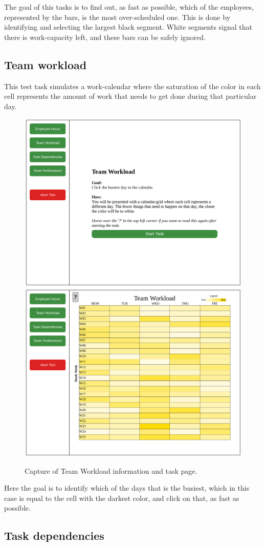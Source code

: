 {		The goal of this tasks is to find out, as fast as possible, which of the
		employees, represented by the bars, is the most over-scheduled one. This is
		done by identifying and selecting the largest black segment. White segments
		signal that there is work-capacity left, and these bars can be safely
		ignored.

  \subsection{Team workload}

		This test task simulates a work-calendar where the saturation of the color
		in each cell represents the amount of work that needs to get done during
		that particular day.

    \begin{figure}[h!]
      \centering
      \includegraphics[width=.49\textwidth]{figures/captures/webapp_team_workload_info.pdf}
      \includegraphics[width=.49\textwidth]{figures/captures/webapp_team_workload_task.pdf}
      \caption{Capture of Team Workload information and task page.}
    \end{figure}

		Here the goal is to identify which of the days that is the busiest, which
		in this case is equal to the cell with the darkest color, and click on
		that, as fast as possible.

  \newpage
  \subsection{Task dependencies}

}
